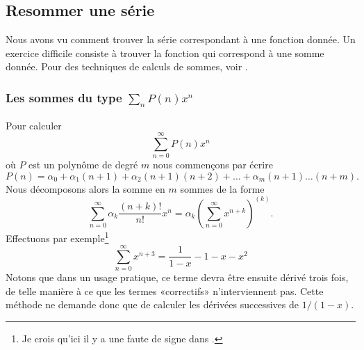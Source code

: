 \subsection{Resommer une série}

Nous avons vu comment trouver la série correspondant à une fonction donnée. Un exercice difficile consiste à trouver la fonction qui correspond à une somme donnée. Pour des techniques de calculs de sommes, voir \cite{DAnSerEntiere}.

\subsubsection{Les sommes du type \texorpdfstring{$ \sum_nP(n)x^n$}{P}}

Pour calculer 
\begin{equation}
    \sum_{n=0}^{\infty}P(n)x^n
\end{equation}
où \( P\) est un polynôme de degré \( m\) nous commençons par écrire
\begin{equation}
    P(n)=\alpha_0+\alpha_1(n+1)+\alpha_2(n+1)(n+2)+\ldots +\alpha_m(n+1)\ldots (n+m).
\end{equation}
Nous décomposons alors la somme en \( m\) sommes de la forme
\begin{equation}
    \sum_{n=0}^{\infty}\alpha_k\frac{ (n+k)! }{ n! }x^n=\alpha_k\left( \sum_{n=0}^{\infty}x^{n+k} \right)^{(k)}.
\end{equation}
Effectuons par exemple\footnote{Je crois qu'ici il y a une faute de signe dans \cite{DAnSerEntiere}.}
\begin{equation}
    \sum_{n=0}^{\infty}x^{n+3}=\frac{1}{ 1-x }-1-x-x^2
\end{equation}
Notons que dans un usage pratique, ce terme devra être ensuite dérivé trois fois, de telle manière à ce que les termes «correctifs» n'interviennent pas. Cette méthode ne demande donc que de calculer les dérivées successives de \( 1/(1-x)\).

